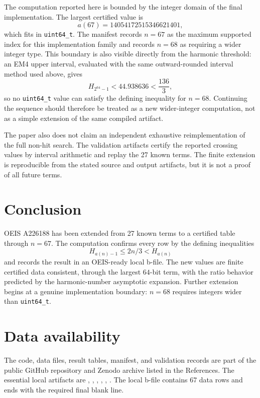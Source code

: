 \documentclass[11pt]{article}
\theoremstyle{definition}
\theoremstyle{remark}
\begin{document}
The computation reported here is bounded by the integer domain of the final
implementation.  The largest certified value is
\[
  a(67)=14054172515346621401,
\]
which fits in \texttt{uint64\_t}.  The manifest records \(n=67\) as the maximum
supported index for this implementation family and records \(n=68\) as
requiring a wider integer type.  This boundary is also visible directly from
the harmonic threshold: an EM4 upper interval, evaluated with the same
outward-rounded interval method used above, gives
\[
  H_{2^{64}-1}<44.938636<\frac{136}{3},
\]
so no \texttt{uint64\_t} value can satisfy the defining inequality for
\(n=68\).  Continuing the sequence should therefore be treated as a new
wider-integer computation, not as a simple extension of the same compiled
artifact.

The paper also does not claim an independent exhaustive reimplementation of the
full non-hit search.  The validation artifacts certify the reported crossing
values by interval arithmetic and replay the 27 known terms.  The finite
extension is reproducible from the stated source and output artifacts, but it
is not a proof of all future terms.

\section{Conclusion}

OEIS A226188 has been extended from 27 known terms to a certified table through
\(n=67\).  The computation confirms every row by the defining inequalities
\[
  H_{a(n)-1}\leq 2n/3 < H_{a(n)}
\]
and records the result in an OEIS-ready local b-file.  The new values are
finite certified data consistent, through the largest \(64\)-bit term, with the
ratio behavior predicted by the harmonic-number asymptotic expansion.  Further
extension begins at a genuine implementation boundary: \(n=68\) requires
integers wider than \texttt{uint64\_t}.

\section*{Data availability}

The code, data files, result tables, manifest, and validation records are part
of the public GitHub repository and Zenodo archive listed in the References.
The essential local artifacts are
, , ,
, ,
.  The local b-file contains 67 data rows
and ends with the required final blank line.
\end{document}

